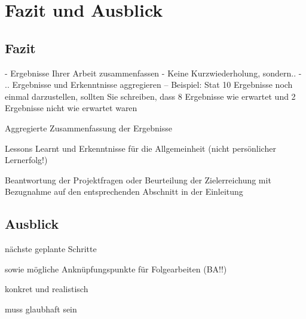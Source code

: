 \section{Fazit und Ausblick}


\subsection{Fazit}
- Ergebnisse Ihrer Arbeit zusammenfassen
- Keine Kurzwiederholung, sondern..
- .. Ergebnisse und Erkenntnisse aggregieren
-- Beispiel: Stat 10 Ergebnisse noch einmal darzustellen, sollten Sie schreiben, dass 8 Ergebnisse wie erwartet und 2 Ergebnisse nicht wie erwartet waren

Aggregierte Zusammenfassung der Ergebnisse

Lessons Learnt und Erkenntnisse für die Allgemeinheit (nicht persönlicher Lernerfolg!)

Beantwortung der Projektfragen oder Beurteilung der Zielerreichung mit Bezugnahme auf den entsprechenden Abschnitt in der Einleitung


\subsection{Ausblick}
nächste geplante Schritte

sowie mögliche Anknüpfungspunkte für Folgearbeiten (BA!!)

konkret und realistisch

muss glaubhaft sein
